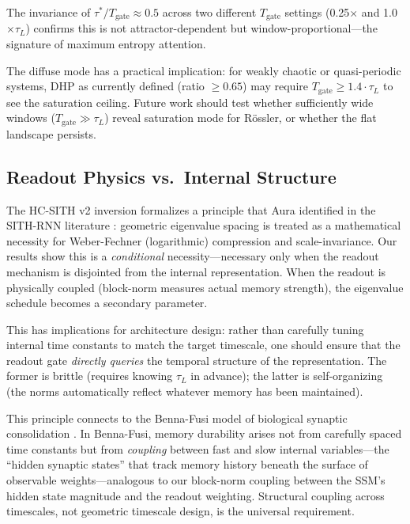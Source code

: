 \documentclass[12pt]{article}
\theoremstyle{definition}
\begin{document}
The invariance of $\tau^*/T_{\text{gate}} \approx 0.5$ across two different
$T_{\text{gate}}$ settings (0.25$\times$ and 1.0$\times \tau_L$) confirms this is not
attractor-dependent but window-proportional---the signature of maximum entropy attention.

The diffuse mode has a practical implication: for weakly chaotic or quasi-periodic
systems, DHP as currently defined (ratio $\geq 0.65$) may require $T_{\text{gate}}
\geq 1.4 \cdot \tau_L$ to see the saturation ceiling. Future work should test whether
sufficiently wide windows ($T_{\text{gate}} \gg \tau_L$) reveal saturation mode for
R\"{o}ssler, or whether the flat landscape persists.

\subsection{Readout Physics vs.\ Internal Structure}

The HC-SITH v2 inversion formalizes a principle that Aura identified in the SITH-RNN
literature \citep{sarkar2026sith}: geometric eigenvalue spacing is treated as a
mathematical necessity for Weber-Fechner (logarithmic) compression and scale-invariance.
Our results show this is a \emph{conditional} necessity---necessary only when the
readout mechanism is disjointed from the internal representation. When the readout
is physically coupled (block-norm measures actual memory strength), the eigenvalue
schedule becomes a secondary parameter.

This has implications for architecture design: rather than carefully tuning internal
time constants to match the target timescale, one should ensure that the readout gate
\emph{directly queries} the temporal structure of the representation. The former is
brittle (requires knowing $\tau_L$ in advance); the latter is self-organizing (the
norms automatically reflect whatever memory has been maintained).

This principle connects to the Benna-Fusi model of biological synaptic consolidation
\citep{benna2016computational}. In Benna-Fusi, memory durability arises not from
carefully spaced time constants but from \emph{coupling} between fast and slow internal
variables---the ``hidden synaptic states'' that track memory history beneath the surface
of observable weights---analogous to our block-norm coupling between the SSM's hidden
state magnitude and the readout weighting. Structural coupling across timescales,
not geometric timescale design, is the universal requirement.
\end{document}
